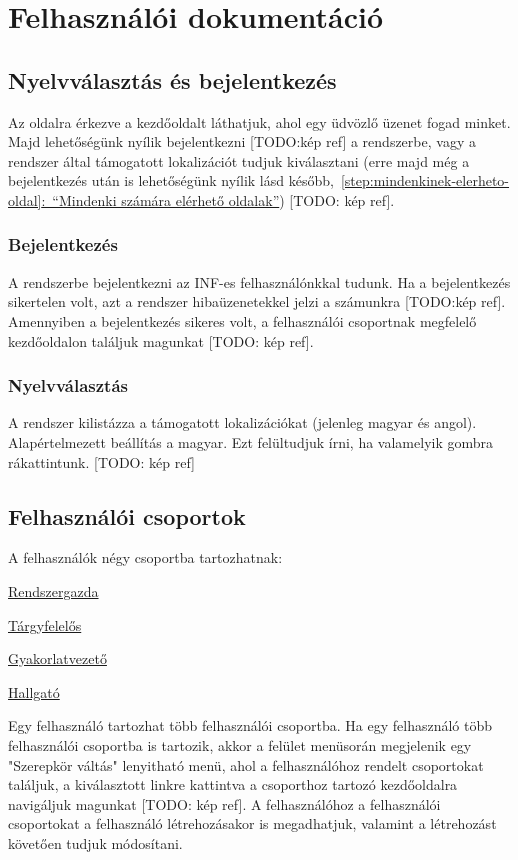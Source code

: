 \chapter{Felhasználói dokumentáció} %
\label{ch:user}

\section{Nyelvválasztás és bejelentkezés}
Az oldalra érkezve a kezdőoldalt láthatjuk, ahol egy üdvözlő üzenet fogad minket. Majd lehetőségünk nyílik bejelentkezni [TODO:kép ref] a rendszerbe, vagy a rendszer által támogatott lokalizációt tudjuk kiválasztani (erre majd még a bejelentkezés után is lehetőségünk nyílik lásd később,~\hyperref[step:mindenkinek-elerheto-oldal]{\ref{step:mindenkinek-elerheto-oldal}:~``Mindenki számára elérhető oldalak''}) [TODO: kép ref].
\subsection{Bejelentkezés}
A rendszerbe bejelentkezni az INF-es felhasználónkkal tudunk. Ha a bejelentkezés sikertelen volt, azt a rendszer hibaüzenetekkel jelzi a számunkra [TODO:kép ref]. Amennyiben a bejelentkezés sikeres volt, a felhasználói csoportnak megfelelő kezdőoldalon találjuk magunkat [TODO: kép ref].
\subsection{Nyelvválasztás}
A rendszer kilistázza a támogatott lokalizációkat (jelenleg magyar és angol). Alapértelmezett beállítás a magyar. Ezt felültudjuk írni, ha valamelyik gombra rákattintunk. [TODO: kép ref]
\section{Felhasználói csoportok}
A felhasználók négy csoportba tartozhatnak:
\begin{compactitem}
    \item \hyperref[step:admin-role]{Rendszergazda}
    \item \hyperref[step:teacher-role]{Tárgyfelelős}
    \item \hyperref[step:instructor-role]{Gyakorlatvezető}
    \item \hyperref[step:student-role]{Hallgató}
\end{compactitem}
Egy felhasználó tartozhat több felhasználói csoportba. Ha egy felhasználó több felhasználói csoportba is tartozik, akkor a felület menüsorán megjelenik egy "Szerepkör váltás" lenyitható menü, ahol a felhasználóhoz rendelt csoportokat találjuk, a kiválasztott linkre kattintva a csoporthoz tartozó kezdőoldalra navigáljuk magunkat [TODO: kép ref]. A felhasználóhoz a felhasználói csoportokat a felhasználó létrehozásakor is megadhatjuk, valamint a létrehozást követően tudjuk módosítani.
